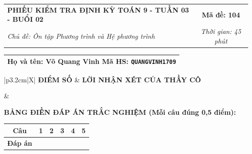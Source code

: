 \documentclass[12pt,a4paper]{article}
\begin{document}
\newpage


\noindent
\begin{tabularx}{\linewidth}{|X|c|}
\hline
\textbf{PHIẾU KIỂM TRA ĐỊNH KỲ TOÁN 9 - TUẦN 03 - BUỔI 02} & \textbf{Mã đề: 104} \\
\textit{Chủ đề: Ôn tập Phương trình và Hệ phương trình} & \textit{Thời gian: 45 phút} \\
\hline
\end{tabularx}

\vspace{1mm}

\noindent
\begin{tabularx}{\linewidth}{|X|}
\hline
\rule[-2mm]{0pt}{7.5mm}\textbf{Họ và tên:} \textbf{\large Võ Quang Vinh} \hfill \textbf{Mã HS:} \texttt{QUANGVINH1709} \quad \\
\hline
\end{tabularx}

\vspace{1mm}

\noindent
\begin{tabularx}{\linewidth}{|p{3.2cm}|X|}
\hline
\centering\textbf{ĐIỂM SỐ} & \centering\textbf{LỜI NHẬN XÉT CỦA THẦY CÔ} \tabularnewline
\hline
\rule{0pt}{1.3cm} & \tabularnewline
\hline
\end{tabularx}

\vspace{1.2mm}

\noindent\textbf{BẢNG ĐIỀN ĐÁP ÁN TRẮC NGHIỆM (Mỗi câu đúng 0,5 điểm):}
\vspace{0.8mm}

\noindent
\renewcommand{\arraystretch}{1.35}
\begin{tabularx}{\linewidth}{|c|*{5}{>{\centering\arraybackslash}X|}}
\hline
\textbf{Câu} & \textbf{1} & \textbf{2} & \textbf{3} & \textbf{4} & \textbf{5} \\
\hline
\textbf{Đáp án} & & & & & \\
\hline
\end{tabularx}
\renewcommand{\arraystretch}{1.0}

\vspace{1.5mm}
\end{document}
